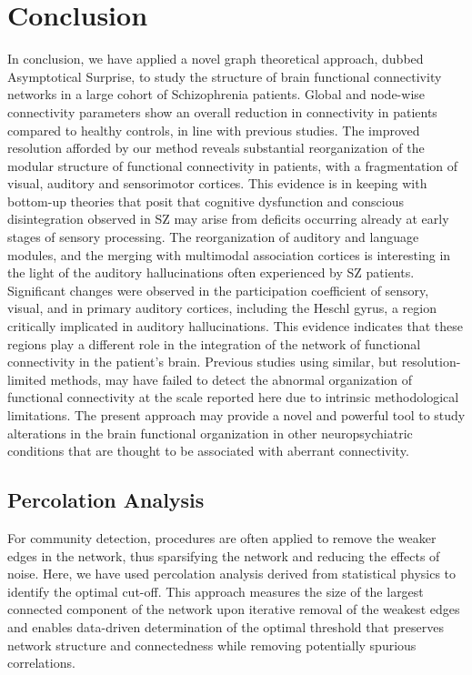 \section{Conclusion}
In conclusion, we have applied a novel graph theoretical approach, dubbed Asymptotical Surprise, to study the structure of brain functional connectivity networks in a large cohort of Schizophrenia patients.
Global and node-wise connectivity parameters show an overall reduction in connectivity in patients compared to healthy controls, in line with previous studies.
The improved resolution afforded by our method reveals substantial reorganization of the modular structure of functional connectivity in patients, with a fragmentation of visual, auditory and sensorimotor cortices.
This evidence is in keeping with bottom-up theories that posit that cognitive dysfunction and conscious disintegration observed in SZ may arise from deficits occurring already at early stages of sensory processing.
The reorganization of auditory and language modules, and the merging with multimodal association cortices is interesting in the light of the auditory hallucinations often experienced by SZ patients.
Significant changes were observed in the participation coefficient of sensory, visual, and in primary auditory cortices, including the Heschl gyrus, a region critically implicated in auditory hallucinations.
This evidence indicates that these regions play a different role in the integration of the network of functional connectivity in the patient’s brain.
Previous studies using similar, but resolution-limited methods, may have failed to detect the abnormal organization of functional connectivity at the scale reported here due to intrinsic methodological limitations.
The present approach may provide a novel and powerful tool to study alterations in the brain functional organization in other neuropsychiatric conditions that are thought to be associated with aberrant connectivity.

\subsection{Percolation Analysis}
For community detection, procedures are often applied to remove the weaker edges in the network, thus sparsifying the network and reducing the effects of noise. Here, we have used percolation analysis derived from statistical physics  to identify the optimal cut-off.
This approach measures the size of the largest connected component of the network upon iterative removal of the weakest edges and enables data-driven determination of the optimal threshold that preserves network structure and connectedness while removing potentially spurious correlations.

